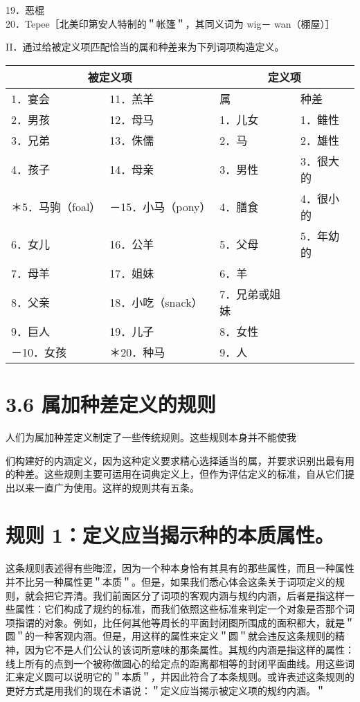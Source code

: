 19．恶棍\\
20．Tepee［北美印第安人特制的＂帐篷＂，其同义词为 wig－ wan（棚屋）］

II．通过给被定义项匹配恰当的属和种差来为下列词项构造定义。

\begin{center}
\begin{tabular}{|l|l|l|l|}
\hline
\multicolumn{2}{|c|}{被定义项} & \multicolumn{2}{|c|}{定义项} \\
\hline
1．宴会 & 11．羔羊 & 属 & 种差 \\
\hline
2．男孩 & 12．母马 & 1．儿女 & 1．雔性 \\
\hline
3．兄弟 & 13．侏儒 & 2．马 & 2．雄性 \\
\hline
4．孩子 & 14．母亲 & 3．男性 & 3．很大的 \\
\hline
＊5．马驹（foal） & －15．小马（pony） & 4．膳食 & 4．很小的 \\
\hline
6．女儿 & 16．公羊 & 5．父母 & 5．年幼的 \\
\hline
7．母羊 & 17．姐妹 & 6．羊 &  \\
\hline
8．父亲 & 18．小吃（snack） & 7．兄弟或姐妹 &  \\
\hline
9．巨人 & 19．儿子 & 8．女性 &  \\
\hline
－10．女孩 & ＊20．种马 & 9．人 &  \\
\hline
\end{tabular}
\end{center}

\section*{3.6 属加种差定义的规则}
人们为属加种差定义制定了一些传统规则。这些规则本身并不能使我

们构建好的内涵定义，因为这种定义要求精心选择适当的属，并要求识别出最有用的种差。这些规则主要可运用在词典定义上，但作为评估定义的标准，自从它们提出以来一直广为使用。这样的规则共有五条。

\section*{规则 1：定义应当揭示种的本质属性。}
这条规则表述得有些晦涩，因为一个种本身恰有其具有的那些属性，而且一种属性并不比另一种属性更＂本质＂。但是，如果我们悉心体会这条关于词项定义的规则，就会把它弄清。我们前面区分了词项的客观内涵与规约内涵，后者是指这样一些属性：它们构成了规约的标准，而我们依照这些标准来判定一个对象是否那个词项指谓的对象。例如，比任何其他等周长的平面封闭图所围成的面积都大，就是＂圆＂的一种客观内涵。但是，用这样的属性来定义＂圆＂就会违反这条规则的精神，因为它不是人们公认的该词所意味的那条属性。其规约内涵是指这样的属性：线上所有的点到一个被称做圆心的给定点的距离都相等的封闭平面曲线。用这些词汇来定义圆可以说明它的＂本质＂，并因此符合了本条规则。或许表述这条规则的更好方式是用我们的现在术语说：＂定义应当揭示被定义项的规约内涵。＂


